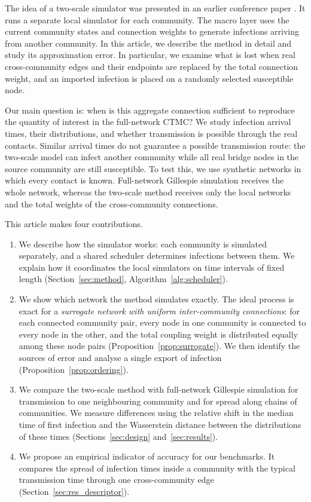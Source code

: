 \documentclass{ieeeaccess}
\begin{document}
The idea of a two-scale simulator was presented in an earlier conference paper \cite{kuryliak2025towards}. It runs a separate local simulator for each community. The macro layer uses the current community states and connection weights to generate infections arriving from another community. In this article, we describe the method in detail and study its approximation error. In particular, we examine what is lost when real cross-community edges and their endpoints are replaced by the total connection weight, and an imported infection is placed on a randomly selected susceptible node.

Our main question is: when is this aggregate connection sufficient to reproduce the quantity of interest in the full-network CTMC? We study infection arrival times, their distributions, and whether transmission is possible through the real contacts. Similar arrival times do not guarantee a possible transmission route: the two-scale model can infect another community while all real bridge nodes in the source community are still susceptible. To test this, we use synthetic networks in which every contact is known. Full-network Gillespie simulation receives the whole network, whereas the two-scale method receives only the local networks and the total weights of the cross-community connections.

This article makes four contributions.
\begin{enumerate}
\item We describe how the simulator works: each community is simulated separately, and a shared scheduler determines infections between them. We explain how it coordinates the local simulators on time intervals of fixed length (Section~\ref{sec:method}, Algorithm~\ref{alg:scheduler}).
\item We show which network the method simulates exactly. The ideal process is exact for a \emph{surrogate network with uniform inter-community connections}: for each connected community pair, every node in one community is connected to every node in the other, and the total coupling weight is distributed equally among these node pairs (Proposition~\ref{prop:surrogate}). We then identify the sources of error and analyse a single export of infection (Proposition~\ref{prop:ordering}).
\item We compare the two-scale method with full-network Gillespie simulation for transmission to one neighbouring community and for spread along chains of communities. We measure differences using the relative shift in the median time of first infection and the Wasserstein distance between the distributions of these times (Sections~\ref{sec:design} and~\ref{sec:results}).
\item We propose an empirical indicator of accuracy for our benchmarks. It compares the spread of infection times inside a community with the typical transmission time through one cross-community edge (Section~\ref{sec:res_descriptor}).
\end{enumerate}
\end{document}
